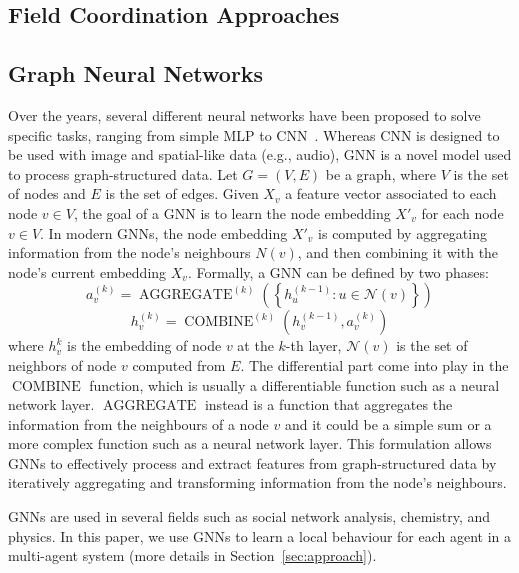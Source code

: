 \documentclass[conference]{IEEEtran}
\begin{document}
\subsection{Field Coordination Approaches}
\subsection{Graph Neural Networks}
Over the years, several different neural networks have been proposed to solve specific tasks, ranging from 
  simple \ac{MLP} to \ac{CNN}~\cite{oshea2015introduction}.
%
Whereas \ac{CNN} is designed to be used with image and spatial-like data (e.g., audio),
 \ac{GNN} is a novel model used to process graph-structured data. 
%
Let $ G = (V, E) $ be a graph, where $ V $ is the set of nodes and $ E $ is the set of edges. 
%
Given $X_v$ a feature vector associated to each node $v \in V$, 
 the goal of a GNN is to learn the node embedding $X'_v$ for each node $v \in V$.
 In modern GNNs, the node embedding $X'_v$ is computed by aggregating information from the node's neighbours $N(v)$,
  and then combining it with the node's current embedding $X_v$.
% 
Formally, a GNN can be defined by two phases:
\begin{equation}
a_{v}^{(k)}=\operatorname{AGGREGATE}^{(k)}\left(\left\{h_{u}^{(k-1)}: u \in \mathcal{N}(v)\right\}\right)   
\end{equation}
\begin{equation}
h_{v}^{(k)}=\operatorname{COMBINE}^{(k)}\left(h_{v}^{(k-1)}, a_{v}^{(k)}\right)
\end{equation}
where $h_{v}^{k}$ is the embedding of node $v$ at the $k$-th layer, 
 $\mathcal{N}(v)$ is the set of neighbors of node $v$ computed from $E$.
%
The differential part come into play in the $\operatorname{COMBINE}$ function, 
 which is usually a differentiable function such as a neural network layer.
%
$\operatorname{AGGREGATE} $ instead is a function that aggregates the information from the neighbours of a node $v$
  and it could be a simple sum or a more complex function such as a neural network layer.
%
This formulation allows GNNs to effectively process and extract features from graph-structured data by iteratively aggregating and transforming information from the node's neighbours.

\acp{GNN} are used in several fields such as social network analysis, chemistry, and physics.
In this paper, we use GNNs to learn a local behaviour for each agent in a multi-agent system (more details in Section~\ref{sec:approach}).
\end{document}
